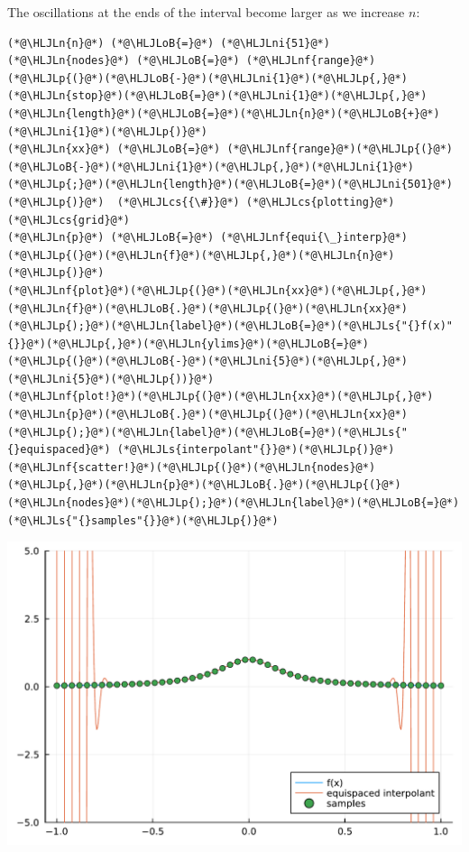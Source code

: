 \documentclass[12pt,a4paper]{article}
\newcommand{\HLJLn}[1]{#1}
\newcommand{\HLJLnf}[1]{\textcolor[RGB]{66,102,213}{#1}}
\newcommand{\HLJLs}[1]{\textcolor[RGB]{201,61,57}{#1}}
\newcommand{\HLJLni}[1]{\textcolor[RGB]{59,151,46}{#1}}
\newcommand{\HLJLoB}[1]{\textcolor[RGB]{102,102,102}{\textbf{#1}}}
\newcommand{\HLJLp}[1]{#1}
\newcommand{\HLJLcs}[1]{\textcolor[RGB]{153,153,119}{\textit{#1}}}
\begin{document}
The oscillations at the ends of the interval become larger as we increase $n$:


\begin{lstlisting}
(*@\HLJLn{n}@*) (*@\HLJLoB{=}@*) (*@\HLJLni{51}@*)
(*@\HLJLn{nodes}@*) (*@\HLJLoB{=}@*) (*@\HLJLnf{range}@*)(*@\HLJLp{(}@*)(*@\HLJLoB{-}@*)(*@\HLJLni{1}@*)(*@\HLJLp{,}@*)(*@\HLJLn{stop}@*)(*@\HLJLoB{=}@*)(*@\HLJLni{1}@*)(*@\HLJLp{,}@*)(*@\HLJLn{length}@*)(*@\HLJLoB{=}@*)(*@\HLJLn{n}@*)(*@\HLJLoB{+}@*)(*@\HLJLni{1}@*)(*@\HLJLp{)}@*)  
(*@\HLJLn{xx}@*) (*@\HLJLoB{=}@*) (*@\HLJLnf{range}@*)(*@\HLJLp{(}@*)(*@\HLJLoB{-}@*)(*@\HLJLni{1}@*)(*@\HLJLp{,}@*)(*@\HLJLni{1}@*)(*@\HLJLp{;}@*)(*@\HLJLn{length}@*)(*@\HLJLoB{=}@*)(*@\HLJLni{501}@*)(*@\HLJLp{)}@*)  (*@\HLJLcs{{\#}}@*) (*@\HLJLcs{plotting}@*) (*@\HLJLcs{grid}@*)
(*@\HLJLn{p}@*) (*@\HLJLoB{=}@*) (*@\HLJLnf{equi{\_}interp}@*)(*@\HLJLp{(}@*)(*@\HLJLn{f}@*)(*@\HLJLp{,}@*)(*@\HLJLn{n}@*)(*@\HLJLp{)}@*) 
(*@\HLJLnf{plot}@*)(*@\HLJLp{(}@*)(*@\HLJLn{xx}@*)(*@\HLJLp{,}@*)(*@\HLJLn{f}@*)(*@\HLJLoB{.}@*)(*@\HLJLp{(}@*)(*@\HLJLn{xx}@*)(*@\HLJLp{);}@*)(*@\HLJLn{label}@*)(*@\HLJLoB{=}@*)(*@\HLJLs{"{}f(x)"{}}@*)(*@\HLJLp{,}@*)(*@\HLJLn{ylims}@*)(*@\HLJLoB{=}@*)(*@\HLJLp{(}@*)(*@\HLJLoB{-}@*)(*@\HLJLni{5}@*)(*@\HLJLp{,}@*)(*@\HLJLni{5}@*)(*@\HLJLp{))}@*)
(*@\HLJLnf{plot!}@*)(*@\HLJLp{(}@*)(*@\HLJLn{xx}@*)(*@\HLJLp{,}@*)(*@\HLJLn{p}@*)(*@\HLJLoB{.}@*)(*@\HLJLp{(}@*)(*@\HLJLn{xx}@*)(*@\HLJLp{);}@*)(*@\HLJLn{label}@*)(*@\HLJLoB{=}@*)(*@\HLJLs{"{}equispaced}@*) (*@\HLJLs{interpolant"{}}@*)(*@\HLJLp{)}@*)
(*@\HLJLnf{scatter!}@*)(*@\HLJLp{(}@*)(*@\HLJLn{nodes}@*)(*@\HLJLp{,}@*)(*@\HLJLn{p}@*)(*@\HLJLoB{.}@*)(*@\HLJLp{(}@*)(*@\HLJLn{nodes}@*)(*@\HLJLp{);}@*)(*@\HLJLn{label}@*)(*@\HLJLoB{=}@*)(*@\HLJLs{"{}samples"{}}@*)(*@\HLJLp{)}@*)
\end{lstlisting}

\includegraphics[width=\linewidth]{jl_hpkPoK/OP_methods_test_4_1.pdf}
\end{document}
